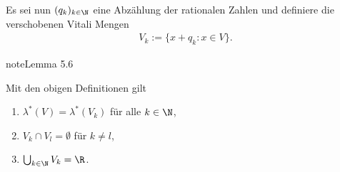 \documentclass[letterpaper,10pt,english]{jupyterBook}
\begin{document}
\sphinxAtStartPar
Es sei nun \((q_k)_{k\in\N}\) eine Abzählung der rationalen Zahlen und definiere die verschobenen Vitali Mengen
\begin{equation*}
\begin{split}V_k :=\{x+q_k: x\in V\}.\end{split}
\end{equation*}\label{masstheorie/masstheorie:lemma-29}
\begin{sphinxadmonition}{note}{Lemma 5.6}



\sphinxAtStartPar
Mit den obigen Definitionen gilt
\begin{enumerate}
%
\item {} 
\sphinxAtStartPar
\(\lambda^\ast(V) = \lambda^\ast(V_k)\) für alle \(k\in\N\),

\item {} 
\sphinxAtStartPar
\(V_k\cap V_l=\emptyset\) für \(k\neq l\),

\item {} 
\sphinxAtStartPar
\(\bigcup_{k\in\N} V_k = \R\).

\end{enumerate}
\end{sphinxadmonition}
\end{document}
